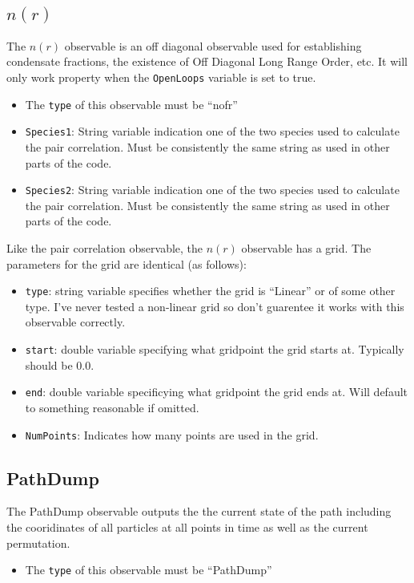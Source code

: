 \documentclass{book}
\begin{document}
\subsection{$n(r)$}
The $n(r)$ observable is an off diagonal observable used for
establishing condensate fractions, the existence of Off Diagonal Long
Range Order, etc. It will only work property when the \texttt{OpenLoops}
variable is set to true.
\begin{itemize}
\item The \texttt{type} of this observable must be ``nofr''
\item \texttt{Species1}: String variable indication one of the two species used to calculate the
  pair correlation. Must be consistently the same string as used in
  other parts of the code.
\item \texttt{Species2}: String variable indication one of the two species used to calculate the
  pair correlation. Must be consistently the same string as used in
  other parts of the code.
\end{itemize}
Like the pair correlation observable, the $n(r)$ observable has a
grid. The parameters for the grid are identical (as follows):
\begin{itemize}
\item \texttt{type}: string variable specifies whether the grid is
  ``Linear'' or of some other type. I've never tested a non-linear
  grid so don't guarentee it works with this observable correctly.
\item \texttt{start}: double variable specifying what gridpoint the grid
  starts at. Typically should be 0.0.
\item \texttt{end}: double variable specificying what gridpoint the
  grid ends at. Will default to something reasonable if omitted.
\item \texttt{NumPoints}: Indicates how many points are used in the grid.
\end{itemize}
\subsection{PathDump}
The PathDump observable outputs the the current state of the path
including the cooridinates of all particles at all points in time as
well as the current permutation.  
\begin{itemize}
\item The \texttt{type} of this observable must be ``PathDump''
\end{itemize}
\end{document}
